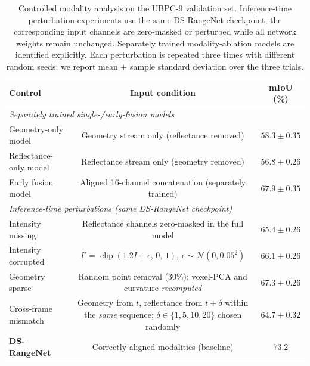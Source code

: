
\begin{table}[H]
\centering
\caption{Controlled modality analysis on the UBPC-9 validation set.
Inference-time perturbation experiments use the same DS-RangeNet
checkpoint; the corresponding input channels are zero-masked or
perturbed while all network weights remain unchanged. Separately
trained modality-ablation models are identified explicitly. Each
perturbation is repeated three times with different random seeds;
we report mean $\pm$ sample standard deviation over the three trials.}
\label{tab:modality_controls}
\begin{tabular}{lcc}
\toprule
\textbf{Control} & \textbf{Input condition} & \textbf{mIoU (\%)} \\
\midrule
\multicolumn{3}{l}{\textit{Separately trained single-/early-fusion models}} \\
\quad Geometry-only model   & Geometry stream only (reflectance removed) & $58.3\pm0.35$ \\
\quad Reflectance-only model & Reflectance stream only (geometry removed) & $56.8\pm0.26$ \\
\quad Early fusion model    & Aligned 16-channel concatenation (separately trained) & $67.9\pm0.35$ \\
\midrule
\multicolumn{3}{l}{\textit{Inference-time perturbations (same DS-RangeNet checkpoint)}} \\
\quad Intensity missing     & Reflectance channels zero-masked in the full model & $65.4\pm0.26$ \\
\quad Intensity corrupted   & $I'=\operatorname{clip}(1.2I+\epsilon,\,0,\,1)$, $\epsilon\sim\mathcal{N}(0,0.05^2)$ & $66.1\pm0.26$ \\
\quad Geometry sparse       & Random point removal (30\%); voxel-PCA and curvature \emph{recomputed} & $67.3\pm0.26$ \\
\quad Cross-frame mismatch  & Geometry from $t$, reflectance from $t{+}\delta$ within the \emph{same} sequence; $\delta\in\{1,5,10,20\}$ chosen randomly & $64.7\pm0.32$ \\
\midrule
\textbf{DS-RangeNet}       & Correctly aligned modalities (baseline) & $\mathbf{73.2}$ \\
\bottomrule
\end{tabular}
\end{table}

